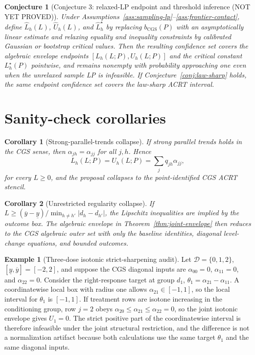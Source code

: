 \documentclass[11pt]{article}
\theoremstyle{definition}
\newtheorem{example}{Example}
\theoremstyle{plain}
\newtheorem{conjecture}{Conjecture}
\newtheorem{corollary}{Corollary}
\theoremstyle{remark}
\begin{document}
\begin{conjecture}[Conjecture 3: relaxed-LP endpoint and threshold inference (NOT YET PROVED)]\label{conj:plugin-inference}
Under Assumptions~\ref{ass:sampling-lp}--\ref{ass:frontier-contact}, define
\(\widehat L_h(L)\), \(\widehat U_h(L)\), and
\(\widehat L_h^\star\) by replacing \(b_{\mathrm{CGS}}(P)\) with an
asymptotically linear estimate and relaxing equality and inequality
constraints by calibrated Gaussian or bootstrap critical values.  Then the
resulting confidence set covers the algebraic envelope endpoints
\([L_h(L;P),U_h(L;P)]\) and the critical constant \(L_h^\star(P)\) pointwise,
and remains nonempty with probability approaching one even when the unrelaxed
sample LP is infeasible.  If Conjecture~\ref{conj:law-sharp} holds, the same
endpoint confidence set covers the law-sharp ACRT interval.
\end{conjecture}

\section{Sanity-check corollaries}
\begin{corollary}[Strong-parallel-trends collapse]\label{cor:spt-collapse}
If strong parallel trends holds in the CGS sense, then
\(\alpha_{j h}=\alpha_{j j}\) for all \(j,h\).  Hence
\[
  L_h(L;P)=U_h(L;P)=\sum_jq_{j h}\alpha_{j j},
\]
for every \(L\ge0\), and the proposal collapses to the point-identified CGS
ACRT stencil.
\end{corollary}

\begin{corollary}[Unrestricted regularity collapse]\label{cor:unrestricted-collapse}
If \(L\ge(\overline y-\underline y)/\min_{h\ne h'}|d_h-d_{h'}|\), the
Lipschitz inequalities are implied by the outcome box.  The algebraic envelope in
Theorem~\ref{thm:joint-envelope} then reduces to the CGS algebraic outer set
with only the baseline identities, diagonal level-change equations, and
bounded outcomes.
\end{corollary}

\begin{example}[Three-dose isotonic strict-sharpening audit]\label{ex:isotone-audit}
Let \(\mathcal D=\{0,1,2\}\), \([\underline y,\overline y]=[-2,2]\), and
suppose the CGS diagonal inputs are
\(\alpha_{00}=0\), \(\alpha_{11}=0\), and \(\alpha_{22}=0\).  Consider the
right-response target at group \(d_1\), \(\theta_1=\alpha_{21}-\alpha_{11}\).
A coordinatewise local box with radius one allows
\(\alpha_{21}\in[-1,1]\), so the local interval for \(\theta_1\) is
\([-1,1]\).  If treatment rows are isotone increasing in the conditioning
group, row \(j=2\) obeys \(\alpha_{20}\le\alpha_{21}\le\alpha_{22}=0\), so the
joint isotonic envelope gives \(U_1=0\).  The strict positive part of the
coordinatewise interval is therefore infeasible under the joint structural
restriction, and the difference is not a normalization artifact because both
calculations use the same target \(\theta_1\) and the same diagonal inputs.
\end{example}
\end{document}
